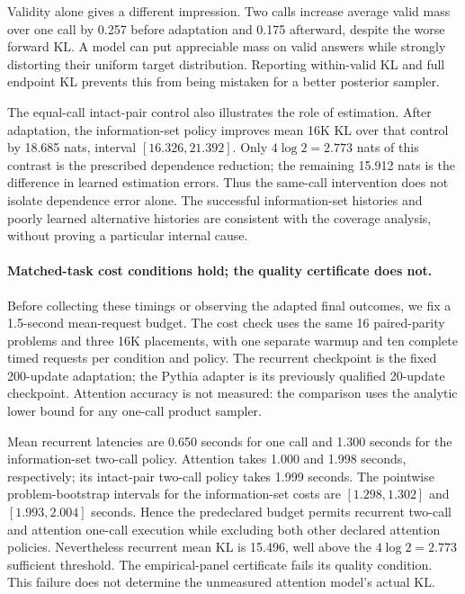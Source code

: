 \documentclass{article}
\begin{document}
Validity alone gives a different impression. Two calls increase average valid
mass over one call by 0.257 before adaptation and 0.175 afterward, despite the
worse forward KL. A model can put appreciable mass on valid answers while
strongly distorting their uniform target distribution. Reporting within-valid
KL and full endpoint KL prevents this from being mistaken for a better
posterior sampler.

The equal-call intact-pair control also illustrates the role of estimation.
After adaptation, the information-set policy improves mean 16K KL over that
control by 18.685 nats, interval $[16.326,21.392]$. Only $4\log2=2.773$ nats
of this contrast is the prescribed dependence reduction; the remaining
15.912 nats is the difference in learned estimation errors. Thus the
same-call intervention does not isolate dependence error alone.
The successful information-set histories and poorly learned alternative
histories are consistent with the coverage analysis, without proving a
particular internal cause.

\paragraph{Matched-task cost conditions hold; the quality certificate does not.}
Before collecting these timings or observing the adapted final outcomes, we
fix a 1.5-second mean-request budget. The cost check uses the same 16
paired-parity problems and three 16K placements, with one separate warmup and
ten complete timed requests per condition and policy. The recurrent checkpoint
is the fixed 200-update adaptation; the Pythia adapter is its previously
qualified 20-update checkpoint. Attention accuracy is not measured: the
comparison uses the analytic lower bound for any one-call product sampler.

Mean recurrent latencies are 0.650 seconds for one call and 1.300 seconds for
the information-set two-call policy. Attention takes 1.000 and 1.998 seconds,
respectively; its intact-pair two-call policy takes 1.999 seconds. The
pointwise problem-bootstrap intervals for the information-set costs are
$[1.298,1.302]$ and $[1.993,2.004]$ seconds. Hence the predeclared budget permits
recurrent two-call and attention one-call execution while excluding both
other declared attention policies. Nevertheless recurrent mean KL is 15.496,
well above the $4\log2=2.773$ sufficient threshold. The empirical-panel
certificate fails its quality condition. This failure does not determine the
unmeasured attention model's actual KL.
\end{document}
